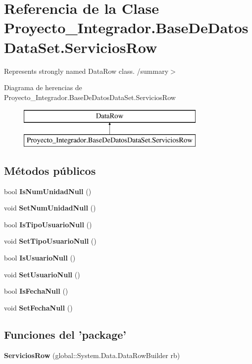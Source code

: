 \section{Referencia de la Clase Proyecto\-\_\-\-Integrador.\-Base\-De\-Datos\-Data\-Set.\-Servicios\-Row}
\label{class_proyecto___integrador_1_1_base_de_datos_data_set_1_1_servicios_row}


Represents strongly named Data\-Row class. /summary$>$  


Diagrama de herencias de Proyecto\-\_\-\-Integrador.\-Base\-De\-Datos\-Data\-Set.\-Servicios\-Row\begin{figure}[H]
\begin{center}
\leavevmode
\includegraphics[height=2.000000cm]{class_proyecto___integrador_1_1_base_de_datos_data_set_1_1_servicios_row}
\end{center}
\end{figure}
\subsection*{Métodos públicos}
\begin{DoxyCompactItemize}
\item 
bool {\bf Is\-Num\-Unidad\-Null} ()
\item 
void {\bf Set\-Num\-Unidad\-Null} ()
\item 
bool {\bf Is\-Tipo\-Usuario\-Null} ()
\item 
void {\bf Set\-Tipo\-Usuario\-Null} ()
\item 
bool {\bf Is\-Usuario\-Null} ()
\item 
void {\bf Set\-Usuario\-Null} ()
\item 
bool {\bf Is\-Fecha\-Null} ()
\item 
void {\bf Set\-Fecha\-Null} ()
\end{DoxyCompactItemize}
\subsection*{Funciones del 'package'}
\begin{DoxyCompactItemize}
\item 
{\bf Servicios\-Row} (global\-::\-System.\-Data.\-Data\-Row\-Builder rb)
\end{DoxyCompactItemize}
